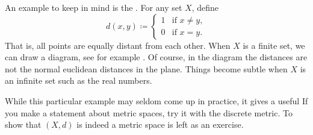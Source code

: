 \begin{example}
An example to keep in mind is the
\emph{}.
For any set $X$, define
\begin{equation*}
d(x,y) \coloneqq
\begin{cases}
1 & \text{if } x \neq y, \\
0 & \text{if } x = y.
\end{cases}
\end{equation*}
That is, all points are equally distant from each other.  When $X$ is a
finite set, we can draw a diagram, see for example
.  Of course, in the diagram the distances 
are not the normal euclidean distances in the plane.
Things become subtle when $X$ is an infinite set such
as the real numbers.
\begin{myfigureht}
\caption{Sample discrete metric space $\{ a,b,c,d,e \}$, the distance
between any two points is $1$.\label{fig:msdiscmetric}}
\end{myfigureht}

While this particular
example may seldom come up in practice, it gives a useful 
  If you make a statement about metric spaces,
try it with the discrete metric.
To show that $(X,d)$ is indeed a metric space is left as an exercise.
\end{example}

